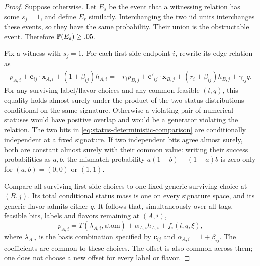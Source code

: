 \begin{proof}
Suppose otherwise. Let $E_s$ be the event that a witnessing relation
has some $s_j=1$, and define $E_r$ similarly. Interchanging the two iid
units interchanges these events, so they have the same probability.
Their union is the obstructable event. Therefore
$\mathbb P(E_s)\ge .05$.

Fix a witness with $s_j=1$. For each first-side endpoint $i$, rewrite
its edge relation as
\begin{align}
p_{A,i}+\mathbf c_{ij}\cdot\mathbf x_{A,i}
                 +(1+\beta_{ij})h_{A,i}
={}&r_i p_{B,j}+\mathbf c'_{ij}\cdot\mathbf x_{B,j}
                 +(r_i+\beta_{ij})h_{B,j}+\gamma_{ij}q.
\label{eq:status-deterministic-comparison}
\end{align}
For any surviving label/flavor choices and any common feasible $(l,q)$,
this equality holds almost surely under the product of the two status
distributions conditional on the same signature. Otherwise a violating
pair of numerical statuses would have positive overlap and would be a
generator violating the relation. The two bits in
\eqref{eq:status-deterministic-comparison} are conditionally independent
at a fixed signature. If two independent bits agree almost surely, both
are constant almost surely with their common value: writing their
success probabilities as $a,b$, the mismatch probability
$a(1-b)+(1-a)b$ is zero only for $(a,b)=(0,0)$ or $(1,1)$.

Compare all surviving first-side choices to one fixed generic surviving
choice at $(B,j)$. Its total conditional status mass is one on every
signature space, and its generic flavor admits either $q$. It follows
that, simultaneously over all tags, feasible bits, labels and flavors
remaining at $(A,i)$,
\begin{equation}
\label{eq:status-extracted-prediction}
p_{A,i}=T(\lambda_{A,i},\mathrm{atom})+\alpha_{A,i}h_{A,i}
                    +f_i(l,q,\xi),
\end{equation}
where $\lambda_{A,i}$ is the basis combination specified by
$\mathbf c_{ij}$ and $\alpha_{A,i}=1+\beta_{ij}$. The coefficients
are common to these choices. The offset is also common across them;
one does not choose a new offset for every label or flavor.


\end{proof}
